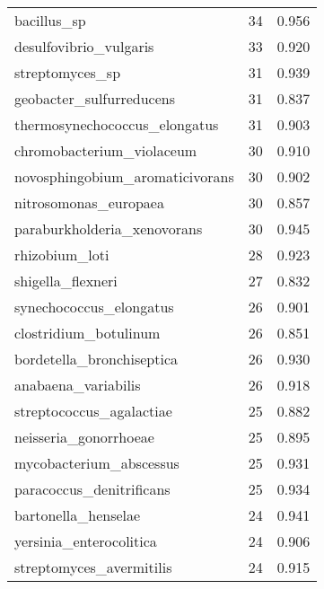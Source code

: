 \begin{tabular}{lrr}
                                 bacillus\_sp &                  34 &     0.956 \\
                      desulfovibrio\_vulgaris &                  33 &     0.920 \\
                             streptomyces\_sp &                  31 &     0.939 \\
                    geobacter\_sulfurreducens &                  31 &     0.837 \\
               thermosynechococcus\_elongatus &                  31 &     0.903 \\
                   chromobacterium\_violaceum &                  30 &     0.910 \\
             novosphingobium\_aromaticivorans &                  30 &     0.902 \\
                       nitrosomonas\_europaea &                  30 &     0.857 \\
                 paraburkholderia\_xenovorans &                  30 &     0.945 \\
                              rhizobium\_loti &                  28 &     0.923 \\
                           shigella\_flexneri &                  27 &     0.832 \\
                     synechococcus\_elongatus &                  26 &     0.901 \\
                       clostridium\_botulinum &                  26 &     0.851 \\
                   bordetella\_bronchiseptica &                  26 &     0.930 \\
                         anabaena\_variabilis &                  26 &     0.918 \\
                    streptococcus\_agalactiae &                  25 &     0.882 \\
                       neisseria\_gonorrhoeae &                  25 &     0.895 \\
                     mycobacterium\_abscessus &                  25 &     0.931 \\
                    paracoccus\_denitrificans &                  25 &     0.934 \\
                         bartonella\_henselae &                  24 &     0.941 \\
                     yersinia\_enterocolitica &                  24 &     0.906 \\
                    streptomyces\_avermitilis &                  24 &     0.915 \\

\end{tabular}
